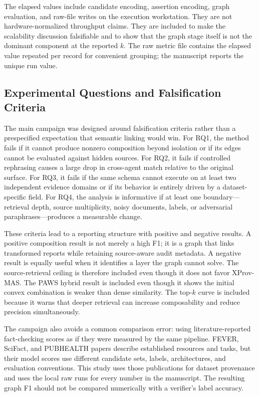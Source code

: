 \documentclass{ieeeaccess}
\begin{document}
The elapsed values include candidate encoding, assertion encoding, graph evaluation, and raw-file writes on the execution workstation. They are not hardware-normalized throughput claims. They are included to make the scalability discussion falsifiable and to show that the graph stage itself is not the dominant component at the reported $k$. The raw metric file contains the elapsed value repeated per record for convenient grouping; the manuscript reports the unique run value.

\subsection{Experimental Questions and Falsification Criteria}
The main campaign was designed around falsification criteria rather than a prespecified expectation that semantic linking would win. For RQ1, the method fails if it cannot produce nonzero composition beyond isolation or if its edges cannot be evaluated against hidden sources. For RQ2, it fails if controlled rephrasing causes a large drop in cross-agent match relative to the original surface. For RQ3, it fails if the same schema cannot execute on at least two independent evidence domains or if its behavior is entirely driven by a dataset-specific field. For RQ4, the analysis is informative if at least one boundary---retrieval depth, source multiplicity, noisy documents, labels, or adversarial paraphrases---produces a measurable change.

These criteria lead to a reporting structure with positive and negative results. A positive composition result is not merely a high F1; it is a graph that links transformed reports while retaining source-aware audit metadata. A negative result is equally useful when it identifies a layer the graph cannot solve. The source-retrieval ceiling is therefore included even though it does not favor XProv-MAS. The PAWS hybrid result is included even though it shows the initial convex combination is weaker than dense similarity. The top-$k$ curve is included because it warns that deeper retrieval can increase composability and reduce precision simultaneously.

The campaign also avoids a common comparison error: using literature-reported fact-checking scores as if they were measured by the same pipeline. FEVER, SciFact, and PUBHEALTH papers describe established resources and tasks, but their model scores use different candidate sets, labels, architectures, and evaluation conventions. This study uses those publications for dataset provenance and uses the local raw runs for every number in the manuscript. The resulting graph F1 should not be compared numerically with a verifier's label accuracy.
\end{document}
